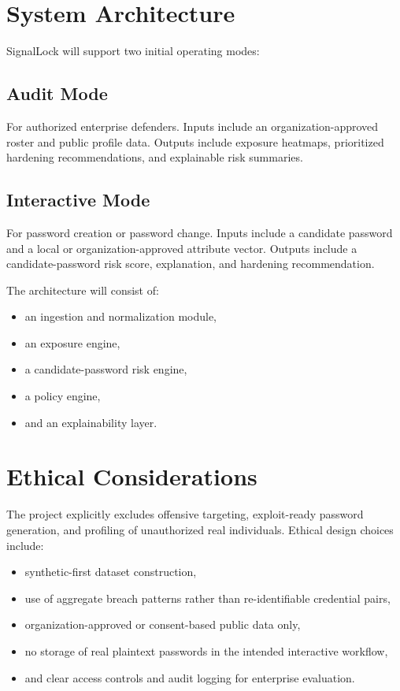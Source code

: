 \documentclass[11pt]{article}
\begin{document}
\section{System Architecture}
SignalLock will support two initial operating modes:

\subsection{Audit Mode}
For authorized enterprise defenders. Inputs include an organization-approved roster and public profile data. Outputs include exposure heatmaps, prioritized hardening recommendations, and explainable risk summaries.

\subsection{Interactive Mode}
For password creation or password change. Inputs include a candidate password and a local or organization-approved attribute vector. Outputs include a candidate-password risk score, explanation, and hardening recommendation.

The architecture will consist of:

\begin{itemize}[leftmargin=*]
  \item an ingestion and normalization module,
  \item an exposure engine,
  \item a candidate-password risk engine,
  \item a policy engine,
  \item and an explainability layer.
\end{itemize}

\section{Ethical Considerations}
The project explicitly excludes offensive targeting, exploit-ready password generation, and profiling of unauthorized real individuals. Ethical design choices include:

\begin{itemize}[leftmargin=*]
  \item synthetic-first dataset construction,
  \item use of aggregate breach patterns rather than re-identifiable credential pairs,
  \item organization-approved or consent-based public data only,
  \item no storage of real plaintext passwords in the intended interactive workflow,
  \item and clear access controls and audit logging for enterprise evaluation.
\end{itemize}
\end{document}
